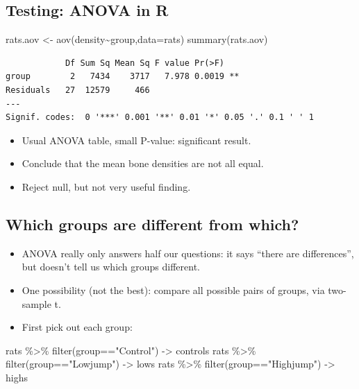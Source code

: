 \documentclass[
  letterpaper,
  DIV=11,
  numbers=noendperiod]{scrartcl}
\newenvironment{Shaded}{\begin{snugshade}}{\end{snugshade}}
\newcommand{\AttributeTok}[1]{\textcolor[rgb]{0.40,0.45,0.13}{#1}}
\newcommand{\FunctionTok}[1]{\textcolor[rgb]{0.28,0.35,0.67}{#1}}
\newcommand{\NormalTok}[1]{\textcolor[rgb]{0.00,0.23,0.31}{#1}}
\newcommand{\OtherTok}[1]{\textcolor[rgb]{0.00,0.23,0.31}{#1}}
\newcommand{\SpecialCharTok}[1]{\textcolor[rgb]{0.37,0.37,0.37}{#1}}
\newcommand{\StringTok}[1]{\textcolor[rgb]{0.13,0.47,0.30}{#1}}
\providecommand{\tightlist}{%
  \setlength{\itemsep}{0pt}\setlength{\parskip}{0pt}}\usepackage{longtable,booktabs,array}
\begin{document}
\hypertarget{testing-anova-in-r}{%
\subsection{Testing: ANOVA in R}\label{testing-anova-in-r}}

\begin{Shaded}
\begin{Highlighting}[]
\NormalTok{rats.aov }\OtherTok{\textless{}{-}} \FunctionTok{aov}\NormalTok{(density}\SpecialCharTok{\textasciitilde{}}\NormalTok{group,}\AttributeTok{data=}\NormalTok{rats)}
\FunctionTok{summary}\NormalTok{(rats.aov)}
\end{Highlighting}
\end{Shaded}

\begin{verbatim}
            Df Sum Sq Mean Sq F value Pr(>F)   
group        2   7434    3717   7.978 0.0019 **
Residuals   27  12579     466                  
---
Signif. codes:  0 '***' 0.001 '**' 0.01 '*' 0.05 '.' 0.1 ' ' 1
\end{verbatim}

\begin{itemize}
\tightlist
\item
  Usual ANOVA table, small P-value: significant result.
\item
  Conclude that the mean bone densities are not all equal.
\item
  Reject null, but not very useful finding.
\end{itemize}

\hypertarget{which-groups-are-different-from-which}{%
\subsection{Which groups are different from
which?}\label{which-groups-are-different-from-which}}

\begin{itemize}
\tightlist
\item
  ANOVA really only answers half our questions: it says ``there are
  differences'', but doesn't tell us which groups different.
\item
  One possibility (not the best): compare all possible pairs of groups,
  via two-sample t.
\item
  First pick out each group:
\end{itemize}

\begin{Shaded}
\begin{Highlighting}[]
\NormalTok{rats }\SpecialCharTok{\%\textgreater{}\%} \FunctionTok{filter}\NormalTok{(group}\SpecialCharTok{==}\StringTok{"Control"}\NormalTok{) }\OtherTok{{-}\textgreater{}}\NormalTok{ controls}
\NormalTok{rats }\SpecialCharTok{\%\textgreater{}\%} \FunctionTok{filter}\NormalTok{(group}\SpecialCharTok{==}\StringTok{"Lowjump"}\NormalTok{) }\OtherTok{{-}\textgreater{}}\NormalTok{ lows}
\NormalTok{rats }\SpecialCharTok{\%\textgreater{}\%} \FunctionTok{filter}\NormalTok{(group}\SpecialCharTok{==}\StringTok{"Highjump"}\NormalTok{) }\OtherTok{{-}\textgreater{}}\NormalTok{ highs}
\end{Highlighting}
\end{Shaded}
\end{document}
